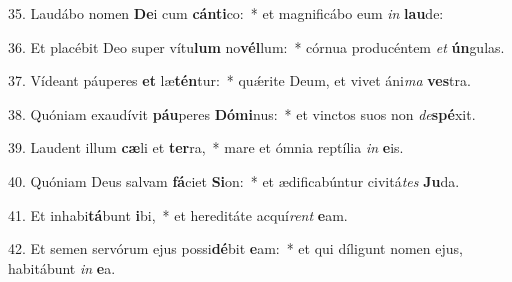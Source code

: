 35. Laudábo nomen \textbf{De}i cum \textbf{cán}\textbf{ti}co:~*  et magnificábo eum \textit{in} \textbf{lau}de:\

36. Et placébit Deo super vítu\textbf{lum} no\textbf{vél}lum:~*  córnua producéntem \textit{et} \textbf{ún}gulas.\

37. Vídeant páuperes \textbf{et} læ\textbf{tén}tur:~*  quǽrite Deum, et vivet áni\textit{ma} \textbf{ves}tra.\

38. Quóniam exaudívit \textbf{páu}peres \textbf{Dó}\textbf{mi}nus:~*  et vinctos suos non \textit{de}\textbf{spé}xit.\

39. Laudent illum \textbf{cæ}li et \textbf{ter}ra,~*  mare et ómnia reptília \textit{in} \textbf{e}is.\

40. Quóniam Deus salvam \textbf{fá}ciet \textbf{Si}on:~*  et ædificabúntur civitá\textit{tes} \textbf{Ju}da.\

41. Et inhabi\textbf{tá}bunt \textbf{i}bi,~*  et hereditáte acquí\textit{rent} \textbf{e}am.\

42. Et semen servórum ejus possi\textbf{dé}bit \textbf{e}am:~*  et qui díligunt nomen ejus, habitábunt \textit{in} \textbf{e}a.\

